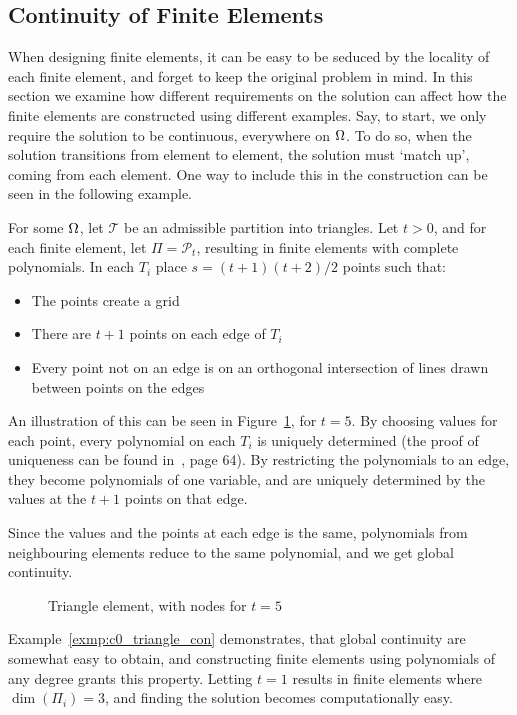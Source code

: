 \subsection{Continuity of Finite Elements}
When designing finite elements, it can be easy to be seduced by the 
locality of each finite element, and forget to keep the original 
problem in mind. In this section we examine how different requirements 
on the solution can affect how the finite elements are constructed 
using different examples.
Say, to start, we only require the solution to be continuous, 
everywhere on $\Omega$.
To do so, when the solution transitions from element to element, 
the solution must `match up', coming from each element. 
One way to include this in the construction can be seen in the 
following example.
\begin{exmp}{\quad\label{exmp:c0_triangle_con}}
For some $\Omega$, let $\mathcal{T}$ be an admissible partition into 
triangles. 
Let $t >0$, and for each finite element, let $\Pi = \mathcal{P}_t$, resulting 
in finite elements with complete polynomials.
In each $T_i$ place
$s = (t+1)(t+2)/2$ points such that:
\begin{itemize}
    \item The points create a grid
    \item There are $t+1$ points on each edge of $T_i$
    \item Every point not on an edge is on an orthogonal intersection of lines drawn between points on the edges 
\end{itemize} 
An illustration of this can be seen in Figure~\ref{fig:triangle_nodal}, for 
$t=5$.
By choosing values for each point, every polynomial on each $T_i$ 
is uniquely determined (the proof of uniqueness can be found in~\cite{Braess}, page 64).
By restricting the polynomials to an edge, they become polynomials of 
one variable, and are uniquely determined by the values at the $t+1$ points 
on that edge.

Since the values and the points at each edge is the same, polynomials from 
neighbouring elements reduce to the same polynomial, and we get global 
continuity.
\end{exmp}
\begin{figure}[ht]
    \centering
    
    \caption{Triangle element, with nodes for $t=5$}\label{fig:triangle_nodal}
\end{figure}
Example~\ref{exmp:c0_triangle_con} demonstrates, that global continuity are 
somewhat easy to obtain, and constructing finite elements using polynomials 
of any degree grants this property. Letting $t=1$ results in finite elements 
where $\dim(\Pi_i)=3$, and finding the solution becomes computationally 
easy.

